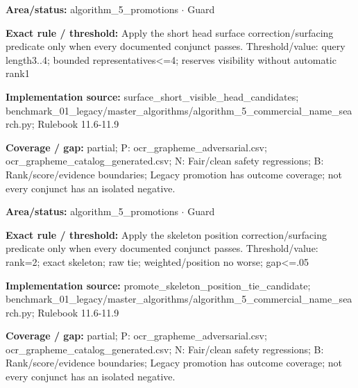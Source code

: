 \begin{tcolorbox}[enhanced,breakable,colback=white,colframe=Muted!45,boxrule=0.45pt,arc=1.5pt,left=6pt,right=6pt,top=5pt,bottom=5pt,title={\texttt{A5-PROMOTE-SHORT-HEAD-SURFACE}},title after break={\texttt{A5-PROMOTE-SHORT-HEAD-SURFACE}\ (continued)},fonttitle=\headingfont\bfseries\color{Navy},coltitle=Navy]
\textbf{Area/status:} algorithm\_\allowbreak{}5\_\allowbreak{}promotions $\boldsymbol{\cdot}$ Guard\par
\smallskip
\textbf{Exact rule / threshold:} Apply the short head surface correction/\allowbreak{}surfacing predicate only when every documented conjunct passes. Threshold/\allowbreak{}value: query length3..4; bounded representatives<=4; reserves visibility without automatic rank1\par
\smallskip
\textbf{Implementation source:} surface\_\allowbreak{}short\_\allowbreak{}visible\_\allowbreak{}head\_\allowbreak{}candidates; benchmark\_\allowbreak{}01\_\allowbreak{}legacy/\allowbreak{}master\_\allowbreak{}algorithms/\allowbreak{}algorithm\_\allowbreak{}5\_\allowbreak{}commercial\_\allowbreak{}name\_\allowbreak{}search.py; Rulebook 11.6-11.9\par
\smallskip
\textbf{Coverage / gap:} partial; P: ocr\_\allowbreak{}grapheme\_\allowbreak{}adversarial.csv; ocr\_\allowbreak{}grapheme\_\allowbreak{}catalog\_\allowbreak{}generated.csv; N: Fair/\allowbreak{}clean safety regressions; B: Rank/\allowbreak{}score/\allowbreak{}evidence boundaries; Legacy promotion has outcome coverage; not every conjunct has an isolated negative.
\end{tcolorbox}
\begin{tcolorbox}[enhanced,breakable,colback=white,colframe=Muted!45,boxrule=0.45pt,arc=1.5pt,left=6pt,right=6pt,top=5pt,bottom=5pt,title={\texttt{A5-PROMOTE-SKELETON-POSITION}},title after break={\texttt{A5-PROMOTE-SKELETON-POSITION}\ (continued)},fonttitle=\headingfont\bfseries\color{Navy},coltitle=Navy]
\textbf{Area/status:} algorithm\_\allowbreak{}5\_\allowbreak{}promotions $\boldsymbol{\cdot}$ Guard\par
\smallskip
\textbf{Exact rule / threshold:} Apply the skeleton position correction/\allowbreak{}surfacing predicate only when every documented conjunct passes. Threshold/\allowbreak{}value: rank=2; exact skeleton; raw tie; weighted/\allowbreak{}position no worse; gap<=.05\par
\smallskip
\textbf{Implementation source:} promote\_\allowbreak{}skeleton\_\allowbreak{}position\_\allowbreak{}tie\_\allowbreak{}candidate; benchmark\_\allowbreak{}01\_\allowbreak{}legacy/\allowbreak{}master\_\allowbreak{}algorithms/\allowbreak{}algorithm\_\allowbreak{}5\_\allowbreak{}commercial\_\allowbreak{}name\_\allowbreak{}search.py; Rulebook 11.6-11.9\par
\smallskip
\textbf{Coverage / gap:} partial; P: ocr\_\allowbreak{}grapheme\_\allowbreak{}adversarial.csv; ocr\_\allowbreak{}grapheme\_\allowbreak{}catalog\_\allowbreak{}generated.csv; N: Fair/\allowbreak{}clean safety regressions; B: Rank/\allowbreak{}score/\allowbreak{}evidence boundaries; Legacy promotion has outcome coverage; not every conjunct has an isolated negative.
\end{tcolorbox}
